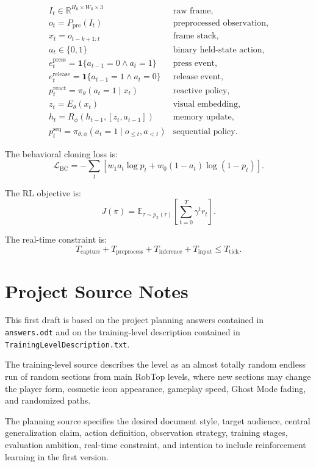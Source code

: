 \documentclass[11pt]{article}
\newcommand{\R}{\mathbb{R}}
\newcommand{\BC}{\mathrm{BC}}
\newcommand{\Ppre}{P_{\mathrm{pre}}}
\newcommand{\indicator}[1]{\mathbf{1}\{#1\}}
\begin{document}
\[
\begin{array}{ll}
I_t \in \R^{H_0 \times W_0 \times 3}
  & \text{raw frame},\\
o_t = \Ppre(I_t)
  & \text{preprocessed observation},\\
x_t = o_{t-k+1:t}
  & \text{frame stack},\\
a_t \in \{0,1\}
  & \text{binary held-state action},\\
e_t^{\mathrm{press}}
  = \indicator{a_{t-1}=0 \wedge a_t=1}
  & \text{press event},\\
e_t^{\mathrm{release}}
  = \indicator{a_{t-1}=1 \wedge a_t=0}
  & \text{release event},\\
p_t^{\mathrm{react}} = \pi_\theta(a_t=1 \mid x_t)
  & \text{reactive policy},\\
z_t = E_\theta(x_t)
  & \text{visual embedding},\\
h_t = R_\phi(h_{t-1},[z_t,a_{t-1}])
  & \text{memory update},\\
p_t^{\mathrm{seq}} = \pi_{\theta,\phi}(a_t=1 \mid o_{\le t},a_{<t})
  & \text{sequential policy}.
\end{array}
\]

The behavioral cloning loss is:
\[
  \mathcal{L}_{\BC}
  =
  -\sum_t
  \left[
    w_1 a_t \log p_t
    +
    w_0(1-a_t)\log(1-p_t)
  \right].
\]

The RL objective is:
\[
  J(\pi)
  =
  \mathbb{E}_{\tau \sim p_\pi(\tau)}
  \left[
    \sum_{t=0}^{T}\gamma^t r_t
  \right].
\]

The real-time constraint is:
\[
  T_{\mathrm{capture}}
  +
  T_{\mathrm{preprocess}}
  +
  T_{\mathrm{inference}}
  +
  T_{\mathrm{input}}
  \le
  T_{\mathrm{tick}}.
\]

\section{Project Source Notes}

This first draft is based on the project planning answers contained in \texttt{answers.odt} and on the training-level description contained in \texttt{TrainingLevelDescription.txt}.

The training-level source describes the level as an almost totally random endless run of random sections from main RobTop levels, where new sections may change the player form, cosmetic icon appearance, gameplay speed, Ghost Mode fading, and randomized paths.

The planning source specifies the desired document style, target audience, central generalization claim, action definition, observation strategy, training stages, evaluation ambition, real-time constraint, and intention to include reinforcement learning in the first version.
\end{document}
